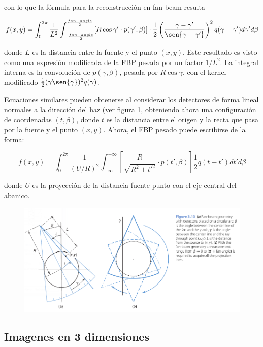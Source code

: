\noindent
con lo que la fórmula para la reconstrucción en fan-beam resulta \cite{fundamentals2009}

\begin{equation}
 f(x,y) = \int_{0}^{2\pi} \frac{1}{L^{2}}\int_{-\frac{fan-angle}{2}}^{\frac{fan-angle}{2}}[R \cos{\gamma' \cdot p(\gamma', \beta)}] \cdot \frac{1}{2}\left(\frac{\gamma - \gamma'}{\sen{\gamma - \gamma'}}\right)^{2} q(\gamma - \gamma')d\gamma'd\beta
\end{equation}

\noindent
donde $L$ es la distancia entre la fuente y el punto $(x,y)$. Este resultado es visto como una expresión modificada de la FBP pesada por un factor $1/L^{2}$. La integral interna es la convolución de $p(\gamma, \beta)$, pesada por $R\cos{\gamma}$, con el kernel modificado $\frac{1}{2}(\gamma \sen{\gamma})^{2}q(\gamma)$.

Ecuaciones similares pueden obtenerse al considerar los detectores de forma lineal normales a la dirección del haz (ver figura \ref{fig:10-3}, obteniendo ahora una configuración de coordenadas $(t, \beta)$, donde $t$ es la distancia entre el origen y la recta que pasa por la fuente y el punto $(x, y)$. Ahora, el FBP pesado puede escribirse de la forma:

\begin{equation}
 f(x, y) = \int_{0}^{2\pi} \frac{1}{(U/R)^{2}}\int_{-\infty}^{+\infty}\left[\frac{R}{\sqrt{R^{2} + t'^{2}}}\cdot p(t', \beta)\right]\frac{1}{2}q(t-t')dt'd\beta
\end{equation}

\noindent
donde $U$ es la proyección de la distancia fuente-punto con el eje central del abanico.

\begin{figure}
 \centering
 \includegraphics[width=.75\textwidth]{figures/cap10-2.png}
 \caption{}
 \label{fig:10-3}
\end{figure}

\subsection{Imagenes en 3 dimensiones}


